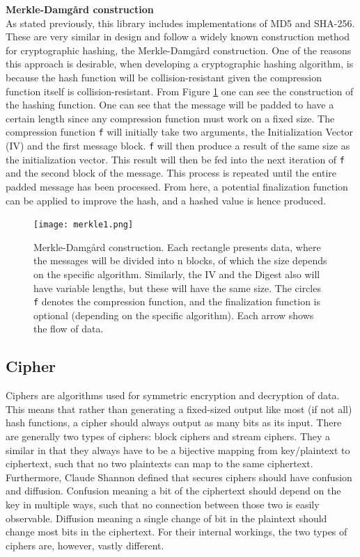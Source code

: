 \documentclass[a4paper, openany]{book}
\begin{document}
\textbf{Merkle-Damgård construction}\\
As stated previously, this library includes implementations of MD5 and SHA-256. These are very similar in design and follow a widely known construction method for cryptographic hashing, the Merkle-Damgård construction. One of the reasons this approach is desirable, when developing a cryptographic hashing algorithm, is because the hash function will be collision-resistant given the compression function itself is collision-resistant\cite{Merkle}.
From Figure \ref{fig:Merkle} one can see the construction of the hashing function. One can see that the message will be padded to have a certain length since any compression function must work on a fixed size. The compression function \texttt{f} will initially take two arguments, the Initialization Vector (IV) and the first message block. \texttt{f} will then produce a result of the same size as the initialization vector. This result will then be fed into the next iteration of \texttt{f} and the second block of the message. This process is repeated until the entire padded message has been processed. From here, a potential finalization function can be applied to improve the hash, and a hashed value is hence produced.

\begin{figure}[H]
\centering
\captionsetup{width=.8\linewidth}
\texttt{[image: merkle1.png]}
\caption[Merkle-Damgård construction]%
{Merkle-Damgård construction. Each rectangle presents data, where the messages will be divided into n blocks, of which the size depends on the specific algorithm. Similarly, the IV and the Digest also will have variable lengths, but these will have the same size. The circles \texttt{f} denotes the compression function, and the finalization function is optional (depending on the specific algorithm). Each arrow shows the flow of data. }
\label{fig:Merkle}
\end{figure}
\subsection{Cipher}
\label{sec:orgd354128}
\label{sec:cipher}
Ciphers are algorithms used for symmetric encryption and decryption of data. This means that rather than generating a fixed-sized output like most (if not all) hash functions, a cipher should always output as many bits as its input. There are generally two types of ciphers: block ciphers and stream ciphers. They a similar in that they always have to be a bijective mapping from key/plaintext to ciphertext, such that no two plaintexts can map to the same ciphertext. Furthermore, Claude Shannon defined\cite{Shannon} that secures ciphers should have confusion and diffusion. Confusion meaning a bit of the ciphertext should depend on the key in multiple ways, such that no connection between those two is easily observable. Diffusion meaning a single change of bit in the plaintext should change most bits in the ciphertext. For their internal workings, the two types of ciphers are, however, vastly different.\\
\end{document}
